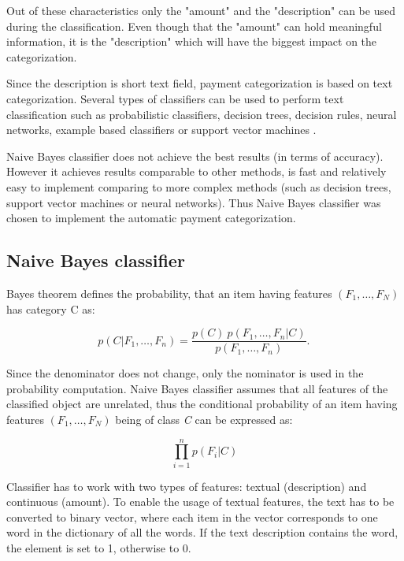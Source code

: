 Out of these characteristics only the "amount" and the "description" can be used during the classification. Even though that the "amount" can hold meaningful information, it is the "description" which will have the biggest impact on the categorization.

Since the description is short text field, payment categorization is based on text categorization. Several types of classifiers can be used to perform text classification such as probabilistic classifiers, decision trees, decision rules, neural networks, example based classifiers or support vector machines \cite{Sebastiani02}.

Naive Bayes classifier does not achieve the best results (in terms of accuracy). However it achieves results comparable to other methods, is fast and relatively easy to implement comparing to more complex methods (such as decision trees, support vector machines or neural networks).\cite{XHemali09} Thus Naive Bayes classifier was chosen to implement the automatic payment categorization.

\subsection{Naive Bayes classifier}
Bayes theorem defines the probability, that an item having features $(F_1,\dots,F_N)$ has category C as\cite{wiki:naiveBayes}:

\begin{equation}
	p(C \vert F_1,\dots,F_n) = \frac{p(C) \ p(F_1,\dots,F_n\vert C)}{p(F_1,\dots,F_n)}. \,
\end{equation}

Since the denominator does not change, only the nominator is used in the probability computation.
Naive Bayes classifier assumes that all features of the classified object are unrelated, thus the conditional probability of an item having features $(F_1,\dots,F_N)$ being of class \textit{C} can be expressed as:

\begin{equation}
	\prod_{i=1}^n p(F_i \vert C)
\end{equation}

Classifier has to work with two types of features: textual (description) and continuous (amount). To enable the usage of textual features, the text has to be converted to binary vector, where each item in the vector corresponds to one word in the dictionary of all the words. If the text description contains the word, the element is set to 1, otherwise to 0.

